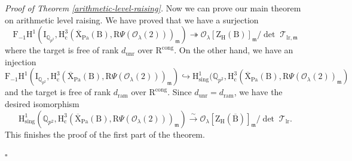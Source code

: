 \documentclass[10pt]{amsart}
\numberwithin{equation}{section}
\theoremstyle{definition}
\newenvironment{myproof}[2] {\emph{Proof of {#1} {#2}.}}{\hfill$\square$}
\def\lr{\mathrm{lr}}
\def\ram{\mathrm{ram}}
\def\Pa{\mathrm{Pa}}
\def\sing{\mathrm{sing}}
\def\calO{\mathcal{O}}
\def\calT{\mathcal{T}}
\def\fracm{\mathfrak{m}}
\def\QQ{\mathbb{Q}}
\def\rmc{\mathrm{c}}
\def\rmB{\mathrm{B}}
\def\rmH{\mathrm{H}}
\def\rmR{\mathrm{R}}
\def\rmX{\mathrm{X}}
\def\rmZ{\mathrm{Z}}
\def\unr{\mathrm{unr}}
\begin{document}
\begin{myproof}{Theorem}{\ref{arithmetic-level-raising}} Now we can prove our main theorem on arithmetic level raising. We have proved that
we have a surjection
\begin{equation*}
\mathrm{F}_{-1}\mathrm{H}^{1}(\mathrm{I}_{\QQ_{p^{2}}}, \mathrm{H}^{3}_{\rmc}(\overline{\rmX}_{\Pa}(\rmB), \rmR\Psi(\calO_{\lambda}(2)))_{\fracm})\twoheadrightarrow 
\calO_{\lambda}[\rmZ_{\rmH}(\rmB)]_{\fracm}/\det\phantom{.}\calT_{\lr, \fracm}
\end{equation*}
where the target is free of rank $d_{\unr}$ over $\rmR^{\mathrm{cong}}$. On the other hand, we have an injection
\begin{equation*}
\mathrm{F}_{-1}\mathrm{H}^{1}(\mathrm{I}_{\QQ_{p^{2}}}, \mathrm{H}^{3}_{\rmc}(\overline{\rmX}_{\Pa}(\rmB), \rmR\Psi(\calO_{\lambda}(2)))_{\fracm})\hookrightarrow \rmH^{1}_{\sing}(\QQ_{p^{2}}, \rmH^{3}_{\rmc}(\overline{\rmX}_{\Pa}(\rmB), \rmR\Psi(\calO_{\lambda}(2))_{\fracm})
\end{equation*}
and the target is free of rank $d_{\ram}$ over $\rmR^{\mathrm{cong}}$. Since $d_{\unr}=d_{\ram}$, we have the desired isomorphism
\begin{equation}\label{first-isom}
\rmH^{1}_{\sing}(\QQ_{p^{2}}, \rmH^{3}_{\rmc}(\overline{\rmX}_{\Pa}(\rmB), \rmR\Psi(\calO_{\lambda}(2)))_{\fracm})\xrightarrow{\sim}\calO_{\lambda}[\rmZ_{\rmH}(\overline{\rmB})]_{\fracm}/\det\phantom{.}\calT_{\lr}.
\end{equation}
This finishes the proof of the first part of the theorem.


\end{myproof}
\end{document}
